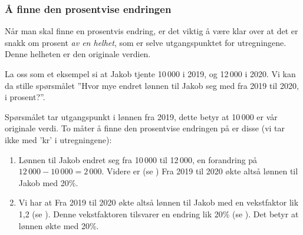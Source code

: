\subsubsection{Å finne den prosentvise endringen}
Når man skal finne en prosentvis endring, er det viktig å være klar over at det er snakk om prosent \textsl{av en helhet}, som er selve utgangspunktet for utregningene. Denne helheten er den originale verdien. \vsk

La oss som et eksempel si at Jakob tjente 10\,000 i 2019, og 12\,000 i 2020. Vi kan da stille spørsmålet ''Hvor mye endret lønnen til Jakob seg med fra 2019 til 2020, i prosent?''. \vsk

Spørsmålet tar utgangspunkt i lønnen fra 2019, dette betyr at 10\,000 er vår originale verdi. To måter å finne den prosentvise endringen på er disse (vi tar ikke med 'kr' i utregningene):
\begin{enumerate}[label=(\roman*)]
\item Lønnen til Jakob endret seg fra 10\,000 til 12\,000, en forandring på $12\,000-10\,000= 2\,000 $. Videre er (se )
Fra 2019 til 2020 økte altså lønnen til Jakob med 20\%. 
\item 
Vi har at
Fra 2019 til 2020 økte altså lønnen til Jakob med en vekstfaktor lik 1,2 (se ). Denne vekstfaktoren tilsvarer en endring lik 20\% (se ). Det betyr at lønnen økte med 20\%.
\end{enumerate}
\newpage
